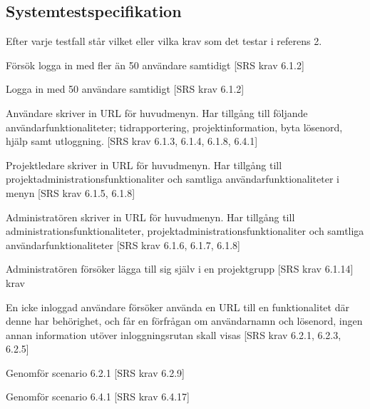 \documentclass[a4paper]{article}
\begin{document}
\newpage

\begin{appendices}

\section{Systemtestspecifikation}

Efter varje testfall står vilket eller vilka krav som det testar i referens 2.

\begin{ST}


\item
Försök logga in med fler än 50 användare samtidigt [SRS krav 6.1.2]

\item
Logga in med 50 användare samtidigt [SRS krav 6.1.2]

\item 
Användare skriver in URL för huvudmenyn. Har tillgång till följande användarfunktionaliteter; tidrapportering, projektinformation, byta lösenord, hjälp samt utloggning. [SRS krav 6.1.3, 6.1.4, 6.1.8, 6.4.1]


\item 
Projektledare skriver in URL för huvudmenyn. Har tillgång till projektadministrationsfunktionaliter och samtliga användarfunktionaliteter i menyn [SRS krav 6.1.5, 6.1.8]

\item 
Administratören skriver in URL för huvudmenyn. Har tillgång till administrationsfunktionaliteter, projektadministrationsfunktionaliter och samtliga användarfunktionaliteter [SRS krav 6.1.6, 6.1.7, 6.1.8]

\item
Administratören försöker lägga till sig själv i en projektgrupp [SRS krav 6.1.14]
krav

\item
En icke inloggad användare försöker använda en URL till en funktionalitet där denne har behörighet, och får en förfrågan om användarnamn och lösenord, ingen annan information utöver inloggningsrutan skall visas [SRS krav 6.2.1, 6.2.3, 6.2.5]

\item
Genomför scenario 6.2.1 [SRS krav 6.2.9]

\item
Genomför scenario 6.4.1 [SRS krav 6.4.17]


\end{ST}
\end{appendices}
\end{document}
